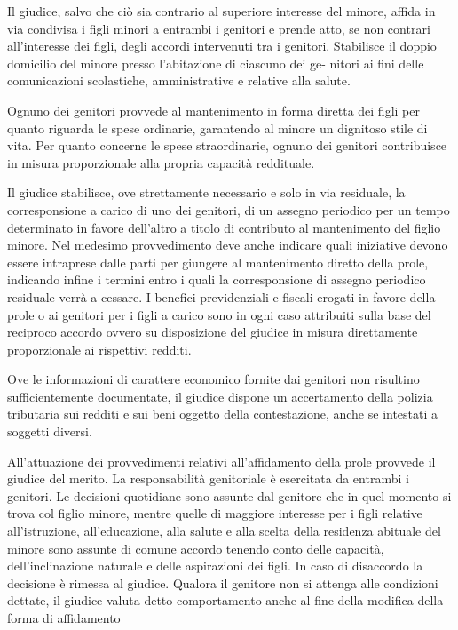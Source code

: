 \documentclass[twocolumn,12pt]{article}
\begin{document}
Il giudice, salvo che ciò sia contrario al
superiore interesse del minore, affida in via
condivisa i figli minori a entrambi i genitori
e prende atto, se non contrari all’interesse
dei figli, degli accordi intervenuti tra i genitori. Stabilisce il doppio domicilio del minore presso l’abitazione di ciascuno dei ge-
nitori ai fini delle comunicazioni scolastiche,
amministrative e relative alla salute.

Ognuno dei genitori provvede al mantenimento in forma diretta
dei figli per quanto riguarda le spese ordinarie, garantendo al minore
un dignitoso stile di vita. Per quanto concerne le spese straordinarie,
ognuno dei genitori contribuisce in misura proporzionale alla propria
capacità reddituale.

Il giudice stabilisce, ove strettamente necessario e solo in via residuale, la corresponsione a carico di uno dei genitori, di un
assegno periodico per un tempo determinato
in favore dell’altro a titolo di contributo al
mantenimento del figlio minore. Nel medesimo provvedimento deve anche indicare
quali iniziative devono essere intraprese
dalle parti per giungere al mantenimento diretto della prole, indicando infine i termini
entro i quali la corresponsione di assegno
periodico residuale verrà a cessare. I benefici previdenziali e fiscali erogati in favore
della prole o ai genitori per i figli a carico
sono in ogni caso attribuiti sulla base del reciproco accordo ovvero su disposizione del
giudice in misura direttamente proporzionale
ai rispettivi redditi.

Ove le informazioni di
carattere economico fornite dai genitori non
risultino sufficientemente documentate, il
giudice dispone un accertamento della polizia tributaria sui redditi e sui beni oggetto
della contestazione, anche se intestati a soggetti diversi.

All’attuazione dei provvedimenti relativi
all’affidamento della prole provvede il giudice del merito. La responsabilità genitoriale
è esercitata da entrambi i genitori. Le decisioni quotidiane sono assunte dal genitore
che in quel momento si trova col figlio minore, mentre quelle di maggiore interesse
per i figli relative all’istruzione, all’educazione, alla salute e alla scelta della residenza
abituale del minore sono assunte di comune
accordo tenendo conto delle capacità, dell’inclinazione naturale e delle aspirazioni dei
figli. In caso di disaccordo la decisione è rimessa al giudice. Qualora il genitore non si
attenga alle condizioni dettate, il giudice valuta detto comportamento anche al fine della
modifica della forma di affidamento
\guillemotright

\bigbreak
{}
\end{document}
